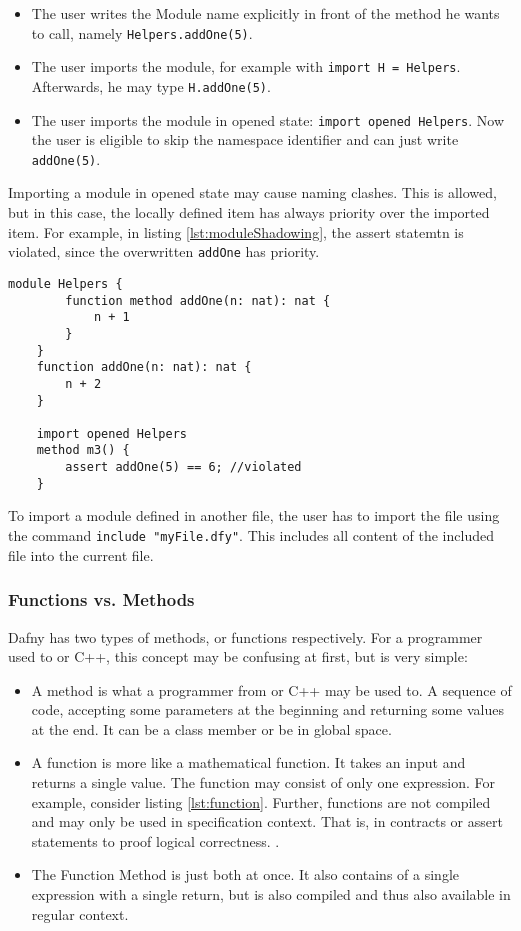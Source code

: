 \begin{itemize}
    \item The user writes the Module name explicitly in front of the method he wants to call, \linebreak namely \texttt{Helpers.addOne(5)}.
    \item The user imports the module, for example with \texttt{import H = Helpers}. Afterwards, he may type \texttt{H.addOne(5)}.
    \item The user imports the module in opened state: \texttt{import opened Helpers}. Now the user is eligible to skip the namespace identifier and can just write \texttt{addOne(5)}.
\end{itemize}

Importing a module in opened state may cause naming clashes. This is allowed, but in this case, the locally defined item has always priority over the imported item. For example, in listing \ref{lst:moduleShadowing}, the assert statemtn is violated, since the overwritten \texttt{addOne} has priority. \cite{functionVSMethod}

\begin{lstlisting}[caption={Naming Clash}, captionpos=b, label={lst:moduleShadowing}]
    module Helpers {
        function method addOne(n: nat): nat {
            n + 1
        }
    }
    function addOne(n: nat): nat {
        n + 2
    }

    import opened Helpers
    method m3() {
        assert addOne(5) == 6; //violated
    }

\end{lstlisting}

To import a module defined in another file, the user has to import the file using the command \texttt{include "myFile.dfy"}. This includes all content of the included file into the current file.

\subsubsection{Functions vs. Methods}
Dafny has two types of methods, or functions respectively. For a programmer used to \Csharp or C++, this concept may be confusing at first, but is very simple:
\begin{itemize}
\item A method is what a programmer from \Csharp or C++ may be used to. A sequence of code, accepting some parameters at the beginning and returning some values at the end. It can be a class member or be in global space.
\item A function is more like a mathematical function. It takes an input and returns a single value. The function may consist of only one expression. For example, consider listing \ref{lst:function}. Further, functions are not compiled and may only be used in specification context. That is, in contracts or assert statements to proof logical correctness. \cite{functionVSMethod}.
\item The Function Method is just both at once. It also contains of a single expression with a single return, but is also compiled and thus also available in regular context. \cite{functionVSMethod}
\end{itemize}

